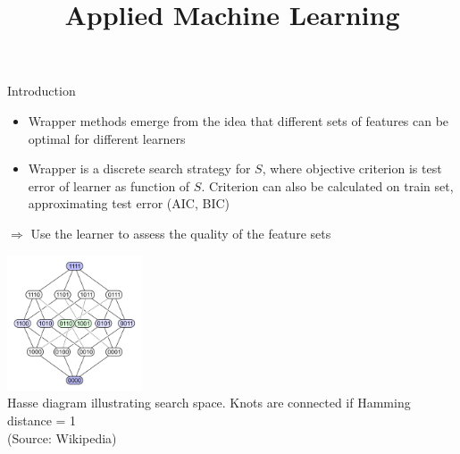 \documentclass[11pt,compress,t,notes=noshow, xcolor=table]{beamer}
\title{Applied Machine Learning}
\date{}
\begin{document}





%  
\begin{vbframe}{Introduction}

    \begin{itemize}
      \item Wrapper methods emerge from the idea that different sets of features can be optimal for different learners
      \item Wrapper is a discrete search strategy for $S$, where objective criterion is test error of learner as function of $S$. Criterion can also be calculated on train set, approximating test error (AIC, BIC)
    \end{itemize}
    $\Rightarrow$ Use the learner to assess the quality of the feature sets
\vspace{-0.1cm}
    \begin{center}
     \includegraphics[width = 0.3\textwidth]{sl/feature-selection/figure/searchspace_binary.png}\\
     \scriptsize{Hasse diagram illustrating search space. Knots are connected if Hamming distance = 1 \\(Source: Wikipedia)}
    \end{center}


\end{vbframe}
\end{document}

